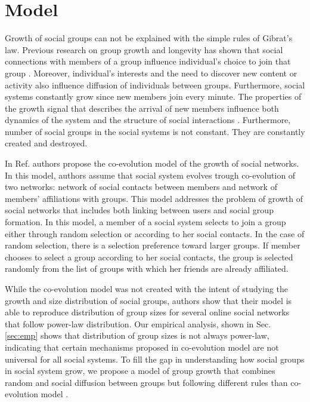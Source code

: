 \section{Model \label{sec:model}}
Growth of social groups can not be explained with the simple rules of Gibrat's law. Previous research on group growth and longevity has shown that social connections with members of a group influence individual's choice to join that group \cite{kairam2012life, zheleva2009co}. Moreover, individual's interests and the need to discover new content or activity also influence diffusion of individuals between groups. Furthermore, social systems constantly grow since new members join every minute. The properties of the growth signal that describes the arrival of new members influence both dynamics of the system \cite{mitrovic2011quantitative, dankulov2015dynamics} and the structure of social interactions \cite{vranic2021growth}. Furthermore, number of social groups in the social systems is not constant. They are constantly created and destroyed.

In Ref. \cite{zheleva2009co} authors propose the co-evolution model of the growth of social networks. In this model, authors assume that social system evolves trough co-evolution of two networks: network of social contacts between members and network of members' affiliations with groups. This model addresses the problem of growth of social networks that includes both linking between users and social group formation. In this model, a member of a social system selects to join a group either through random selection or according to her social contacts. In the case of random selection, there is a selection preference toward larger groups. If member chooses to select a group according to her social contacts, the group is selected randomly from the list of groups with which her friends are already affiliated.

While the co-evolution model \cite{zheleva2009co} was not created with the intent of studying the growth and size distribution of social groups, authors show that their model is able to reproduce distribution of group sizes for several online social networks that follow power-law distribution. Our empirical analysis, shown in Sec. \ref{sec:emp} shows that distribution of group sizes is not always power-law, indicating that certain mechanisms proposed in co-evolution model are not universal for all social systems. To fill the gap in understanding how social groups in social system grow, we propose a model of group growth that combines random and social diffusion between groups but following different rules than co-evolution model \cite{zheleva2009co}.\\



